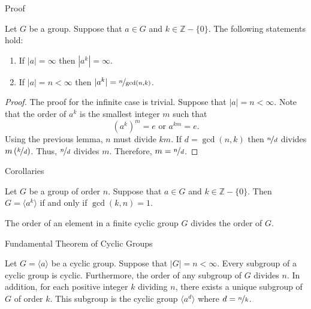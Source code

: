 \documentclass{beamer}
\begin{document}
\begin{frame}{Proof}
\begin{theorem}
\justifying
Let $G$ be a group. Suppose that $a \in G$ and $k \in \mathbb{Z} - \{0\}$. The following statements hold:
\begin{enumerate}
\justifying
\item If $|a| = \infty$ then $|a^{k}| = \infty$.
\item If $|a| = n < \infty$ then $|a^k| = \nicefrac{n}{\gcd(n, k)}$. 
\end{enumerate}
\end{theorem}      
\pause
\begin{proof}
\justifying
The proof for the infinite case is trivial. Suppose that $|a| = n < \infty$. Note that the order of $a^k$ is the smallest integer $m$ such that
\[
\left(a^k\right)^m = e \text{ or } a^{km} = e.
\]
Using the previous lemma, $n$ must divide $km$. If $d = \gcd(n, k)$ then $\nicefrac{n}{d}$ divides $m\left(\nicefrac{k}{d}\right)$. Thus, $\nicefrac{n}{d}$ divides $m$. Therefore, $m = \nicefrac{n}{d}$. 
\end{proof}
\end{frame}

\begin{frame}{Corollaries}
\begin{corollary}
\justifying
Let $G$ be a group of order $n$. Suppose that $a \in G$ and $k \in \mathbb{Z} - \{0\}$. Then $G = \langle a^k\rangle$ if and only if $\gcd(k, n) = 1$.
\end{corollary}
\begin{corollary}
\justifying
The order of an element in a finite cyclic group $G$ divides the order of $G$.
\end{corollary}
\end{frame}

\begin{frame}{Fundamental Theorem of Cyclic Groups}
\begin{theorem}
\justifying
Let $G = \langle a\rangle$ be a cyclic group. Suppose that $|G| = n < \infty$. Every subgroup of a cyclic group is cyclic. Furthermore, the order of any subgroup of $G$ divides $n$. In addition, for each positive integer $k$ dividing $n$, there exists a unique subgroup of $G$ of order $k$. This subgroup is the cyclic group $\langle a^d\rangle$ where $d = \nicefrac{n}{k}$.
\end{theorem}    
\end{frame}
\end{document}
